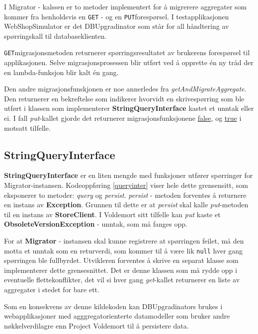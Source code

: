 I Migrator - kalssen er to metoder implementert for å migrerere aggregater som kommer fra henholdsvis en \texttt{GET} - og en \texttt{PUT}\-forespørsel. I testapplikasjonen WebShopSimulator er det DBUpgradinator som står for all håndtering av spørringskall til databaseklienten.



\texttt{GET}\-migrasjonsmetoden returnerer spørringsresultatet av brukerens forespørsel til applikasjonen. Selve migrasjonsprosessen blir utført ved å opprette én ny tråd der en lambda-funksjon blir kalt én gang.



Den andre migrasjonsfunskjonen er noe annerledes fra \emph{getAndMigrateAggregate}. Den returnerer en bekreftelse som indikerer hvorvidt en skrivespørring som ble utført i klassen som implementerer \textbf{StringQueryInterface} kastet et unntak eller ei. I fall \emph{put}-kallet gjorde det returnerer migrasjonsfunksjonene \underline{false}, og \underline{true} i motsatt tilfelle.

\subsection{StringQueryInterface}



\textbf{StringQueryInterface} er en liten mengde med funksjoner utfører spørringer for Migrator-instansen. Kodeoppføring \ref{queryinter} viser hele dette grensensitt, som eksponerer to metoder: \emph{query} og \emph{persist}. \emph{persist} - metoden forventes å returnere en instans av \textbf{Exception}. Grunnen til dette er at \emph{persist} skal kalle \emph{put}-metoden til en instans av \textbf{StoreClient}. I Voldemort sitt tilfelle kan \emph{put} kaste et \textbf{ObsoleteVersionException} - unntak, som må fanges opp. 

For at \textbf{Migrator} - instansen skal kunne registrere at spørringen feilet, må den motta et unntak som en retur\-verdi, som kommer til å være lik \texttt{null} hver gang spørringen ble fullbyrdet. Utvikleren forventes å skrive en separat klasse som implementerer dette grensesnittet. Det er denne klassen som må rydde opp i eventuelle  flettekonflikter, det vil si hver gang \emph{get}-kallet returnerer en liste av aggregater i stedet for bare ett.

Som en konsekvens av denne kildekoden kan DBUpgradinators brukes i webapplikasjoner med agggregatorienterte datamodeller som bruker andre nøkkelverdi\-lagre enn Project Voldemort til å persistere data.

